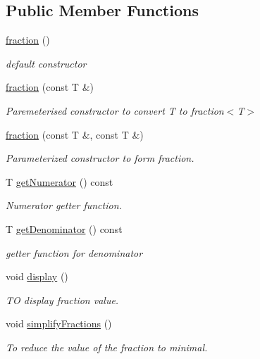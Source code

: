\subsection*{Public Member Functions}
\begin{DoxyCompactItemize}
\item 
\hyperlink{classfraction_a06d1282041ed142bcd60954d574d27c9}{fraction} ()
\begin{DoxyCompactList}\small\item\em default constructor \end{DoxyCompactList}\item 
\hyperlink{classfraction_a5680969378119101e335765e1f61d135}{fraction} (const T \&)
\begin{DoxyCompactList}\small\item\em Paremeterised constructor to convert T to fraction$<$\+T$>$ \end{DoxyCompactList}\item 
\hyperlink{classfraction_a3d993a9a34b792cc9ff5c6580efd1c69}{fraction} (const T \&, const T \&)
\begin{DoxyCompactList}\small\item\em Parameterized constructor to form fraction. \end{DoxyCompactList}\item 
T \hyperlink{classfraction_ab2c71b6d8a1fe8cc38fca27557c8af9e}{get\+Numerator} () const 
\begin{DoxyCompactList}\small\item\em Numerator getter function. \end{DoxyCompactList}\item 
T \hyperlink{classfraction_a99611e6e50d2527d0b19c786995f401f}{get\+Denominator} () const 
\begin{DoxyCompactList}\small\item\em getter function for denominator \end{DoxyCompactList}\item 
void \hyperlink{classfraction_a9449f42f0fe675204aa66f930dc7f424}{display} ()
\begin{DoxyCompactList}\small\item\em TO display fraction value. \end{DoxyCompactList}\item 
void \hyperlink{classfraction_ad9cf1bb8fb5b761ed9bf3d47dd97af21}{simplify\+Fractions} ()
\begin{DoxyCompactList}\small\item\em To reduce the value of the fraction to minimal. \end{DoxyCompactList}\end{DoxyCompactItemize}
